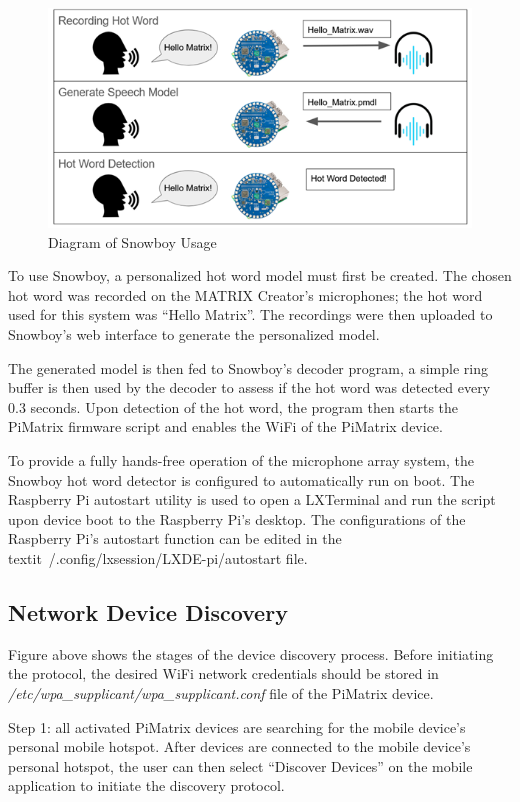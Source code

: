 \documentclass[hidelinks,12pt]{report} %
\begin{document}
\begin{figure}[h]
\centering
\includegraphics[scale = 1.0]{fig4.2} 
\caption{Diagram of Snowboy Usage}
\label{fig}
\end{figure}

To use Snowboy, a personalized hot word model must first be created. The chosen hot word was recorded on the MATRIX Creator’s microphones; the hot word used for this system was “Hello Matrix”. The recordings were then uploaded to Snowboy’s web interface to generate the personalized model. 

The generated model is then fed to Snowboy’s decoder program, a simple ring buffer is then used by the decoder to assess if the hot word was detected every 0.3 seconds. Upon detection of the hot word, the program then starts the PiMatrix firmware script and enables the WiFi of the PiMatrix device. 

To provide a fully hands-free operation of the microphone array system, the Snowboy hot word detector is configured to automatically run on boot. The Raspberry Pi autostart utility is used to open a LXTerminal and run the script upon device boot to the Raspberry Pi’s desktop. The configurations of the Raspberry Pi’s autostart function can be edited in the textit{~/.config/lxsession/LXDE-pi/autostart} file.

\subsection{Network Device Discovery}

Figure above shows the stages of the device discovery process. Before initiating the protocol, the desired WiFi network credentials should be stored in \textit{/etc/wpa\_supplicant/wpa\_supplicant.conf} file of the PiMatrix device.

Step 1: all activated PiMatrix devices are searching for the mobile device’s personal mobile hotspot. After devices are connected to the mobile device’s personal hotspot, the user can then select “Discover Devices” on the mobile application to initiate the discovery protocol.
\end{document}
